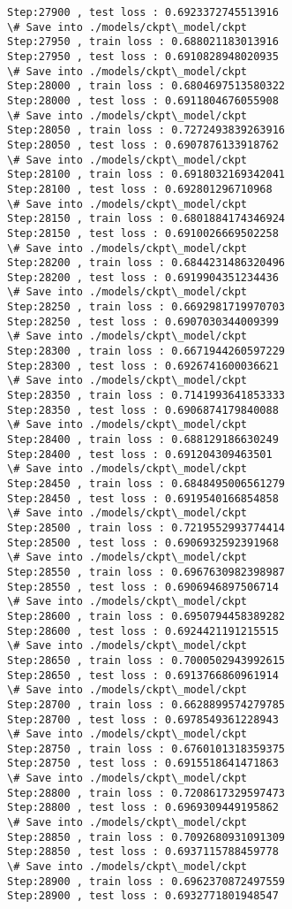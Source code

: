 \documentclass[11pt]{article}
\begin{document}
\begin{Verbatim}[commandchars=\\\{\}]
Step:27900 , test loss : 0.6923372745513916
\# Save into ./models/ckpt\_model/ckpt
Step:27950 , train loss : 0.688021183013916
Step:27950 , test loss : 0.6910828948020935
\# Save into ./models/ckpt\_model/ckpt
Step:28000 , train loss : 0.6804697513580322
Step:28000 , test loss : 0.6911804676055908
\# Save into ./models/ckpt\_model/ckpt
Step:28050 , train loss : 0.7272493839263916
Step:28050 , test loss : 0.6907876133918762
\# Save into ./models/ckpt\_model/ckpt
Step:28100 , train loss : 0.6918032169342041
Step:28100 , test loss : 0.692801296710968
\# Save into ./models/ckpt\_model/ckpt
Step:28150 , train loss : 0.6801884174346924
Step:28150 , test loss : 0.6910026669502258
\# Save into ./models/ckpt\_model/ckpt
Step:28200 , train loss : 0.6844231486320496
Step:28200 , test loss : 0.6919904351234436
\# Save into ./models/ckpt\_model/ckpt
Step:28250 , train loss : 0.6692981719970703
Step:28250 , test loss : 0.6907030344009399
\# Save into ./models/ckpt\_model/ckpt
Step:28300 , train loss : 0.6671944260597229
Step:28300 , test loss : 0.6926741600036621
\# Save into ./models/ckpt\_model/ckpt
Step:28350 , train loss : 0.7141993641853333
Step:28350 , test loss : 0.6906874179840088
\# Save into ./models/ckpt\_model/ckpt
Step:28400 , train loss : 0.688129186630249
Step:28400 , test loss : 0.691204309463501
\# Save into ./models/ckpt\_model/ckpt
Step:28450 , train loss : 0.6848495006561279
Step:28450 , test loss : 0.6919540166854858
\# Save into ./models/ckpt\_model/ckpt
Step:28500 , train loss : 0.7219552993774414
Step:28500 , test loss : 0.6906932592391968
\# Save into ./models/ckpt\_model/ckpt
Step:28550 , train loss : 0.6967630982398987
Step:28550 , test loss : 0.6906946897506714
\# Save into ./models/ckpt\_model/ckpt
Step:28600 , train loss : 0.6950794458389282
Step:28600 , test loss : 0.6924421191215515
\# Save into ./models/ckpt\_model/ckpt
Step:28650 , train loss : 0.7000502943992615
Step:28650 , test loss : 0.6913766860961914
\# Save into ./models/ckpt\_model/ckpt
Step:28700 , train loss : 0.6628899574279785
Step:28700 , test loss : 0.6978549361228943
\# Save into ./models/ckpt\_model/ckpt
Step:28750 , train loss : 0.6760101318359375
Step:28750 , test loss : 0.6915518641471863
\# Save into ./models/ckpt\_model/ckpt
Step:28800 , train loss : 0.7208617329597473
Step:28800 , test loss : 0.6969309449195862
\# Save into ./models/ckpt\_model/ckpt
Step:28850 , train loss : 0.7092680931091309
Step:28850 , test loss : 0.6937115788459778
\# Save into ./models/ckpt\_model/ckpt
Step:28900 , train loss : 0.6962370872497559
Step:28900 , test loss : 0.6932771801948547

\end{Verbatim}
\end{document}
